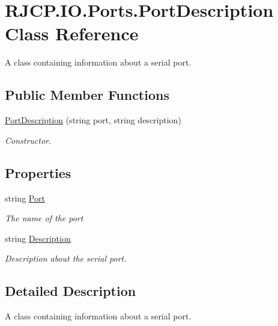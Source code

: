 \hypertarget{class_r_j_c_p_1_1_i_o_1_1_ports_1_1_port_description}{}\section{R\+J\+C\+P.\+I\+O.\+Ports.\+Port\+Description Class Reference}
\label{class_r_j_c_p_1_1_i_o_1_1_ports_1_1_port_description}


A class containing information about a serial port.  


\subsection*{Public Member Functions}
\begin{DoxyCompactItemize}
\item 
\mbox{\hyperlink{class_r_j_c_p_1_1_i_o_1_1_ports_1_1_port_description_a9a717ec62b5fab9355f6db5ed545ca01}{Port\+Description}} (string port, string description)
\begin{DoxyCompactList}\small\item\em Constructor. \end{DoxyCompactList}\end{DoxyCompactItemize}
\subsection*{Properties}
\begin{DoxyCompactItemize}
\item 
string \mbox{\hyperlink{class_r_j_c_p_1_1_i_o_1_1_ports_1_1_port_description_a8e9afb970a70cea5accb89c66723f4be}{Port}}
\begin{DoxyCompactList}\small\item\em The name of the port \end{DoxyCompactList}\item 
string \mbox{\hyperlink{class_r_j_c_p_1_1_i_o_1_1_ports_1_1_port_description_a1c92d3e14698be56649457e2fbe64bd8}{Description}}
\begin{DoxyCompactList}\small\item\em Description about the serial port. \end{DoxyCompactList}\end{DoxyCompactItemize}


\subsection{Detailed Description}
A class containing information about a serial port. 



